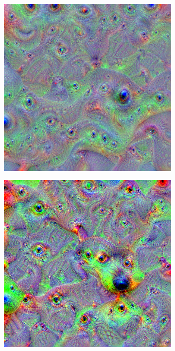 \begin{figure}
    \hfill
    \begin{subfigure}[t]{0.31\textwidth}
        \captionsetup{justification=centering}
        \centering
        \includegraphics[width=.7\linewidth]{figuras/feat_vis/experiments/final/l12/random_image_pl4_lr2.2e-1_layer26.png}
        \caption{}
    \end{subfigure}
    \hfill
    \begin{subfigure}[t]{0.31\textwidth}
        \captionsetup{justification=centering}
        \centering
        \includegraphics[width=.7\linewidth]{figuras/feat_vis/experiments/final/l12/random_image_pl4_lr4e-1_layer26.png}
        \caption{}
    \end{subfigure}
    \begin{subfigure}[t]{0.31\textwidth}
        \captionsetup{justification=centering}
        \centering

\end{subfigure}
\end{figure}

